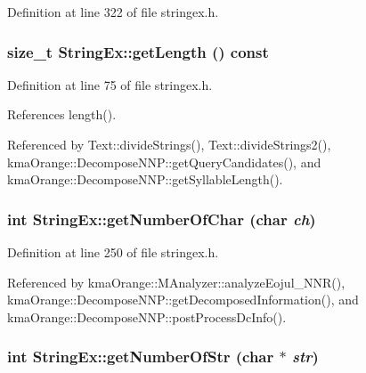 Definition at line 322 of file stringex.h.\hypertarget{classStringEx_ca8d43a55788bf20513aa829a75af7f9}{
\subsubsection[{getLength}]{\setlength{\rightskip}{0pt plus 5cm}size\_\-t StringEx::getLength () const}}
\label{classStringEx_ca8d43a55788bf20513aa829a75af7f9}




Definition at line 75 of file stringex.h.

References length().

Referenced by Text::divideStrings(), Text::divideStrings2(), kmaOrange::DecomposeNNP::getQueryCandidates(), and kmaOrange::DecomposeNNP::getSyllableLength().\hypertarget{classStringEx_e8543abc9cedc0bd34ff926a68b76058}{
\subsubsection[{getNumberOfChar}]{\setlength{\rightskip}{0pt plus 5cm}int StringEx::getNumberOfChar (char {\em ch})}}
\label{classStringEx_e8543abc9cedc0bd34ff926a68b76058}




Definition at line 250 of file stringex.h.

Referenced by kmaOrange::MAnalyzer::analyzeEojul\_\-NNR(), kmaOrange::DecomposeNNP::getDecomposedInformation(), and kmaOrange::DecomposeNNP::postProcessDcInfo().\hypertarget{classStringEx_a8a5eaa3a07cd0878989763399ea63c8}{
\subsubsection[{getNumberOfStr}]{\setlength{\rightskip}{0pt plus 5cm}int StringEx::getNumberOfStr (char $\ast$ {\em str})}}
\label{classStringEx_a8a5eaa3a07cd0878989763399ea63c8}




